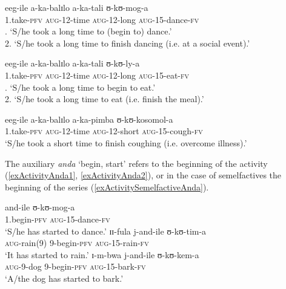\begin{exe}
\ex\label{exActivityTakeXTime}
\begin{xlist}
\ex \gll eeg-ile a-ka-balɪlo a-ka-tali ʊ-kʊ-mog-a\\
1.take-\textsc{pfv} \textsc{aug}-12-time \textsc{aug}-12-long \textsc{aug}-15-dance-\textsc{fv}\\
. \lq S/he took a long time to (begin to) dance.'\\
2. \lq S/he took a long time to finish dancing (i.e. at a social event).'

\ex \gll eeg-ile a-ka-balɪlo a-ka-tali ʊ-kʊ-ly-a\\
1.take-\textsc{pfv} \textsc{aug}-12-time \textsc{aug}-12-long \textsc{aug}-15-eat-\textsc{fv}\\
. \lq  S/he took a long time to begin to eat.'\\
2. \lq  S/he took a long time to eat (i.e. finish the meal).' 

\ex \gll eeg-ile a-ka-balɪlo a-ka-pimba ʊ-kʊ-kosomol-a\\
1.take-\textsc{pfv} \textsc{aug}-12-time \textsc{aug}-12-short \textsc{aug}-15-cough-\textsc{fv}\\
\glt \lq S/he took a short time to finish coughing (i.e. overcome illness).'
\end{xlist}
\end{exe}

The auxiliary \textit{anda} `begin, start' refers to the beginning of the activity (\ref{exActivityAnda1}, \ref{exActivityAnda2}), or in the case of semelfactives the beginning of the series (\ref{exActivitySemelfactiveAnda}).

\begin{exe}
\ex \begin{xlist}
\ex \label{exActivityAnda1}\gll and-ile ʊ-kʊ-mog-a\\
1.begin-\textsc{pfv} \textsc{aug}-15-dance-\textsc{fv}\\
\glt `S/he has started to dance.' 
\ex \label{exActivityAnda2} \gll ɪɪ-fula j-and-ile ʊ-kʊ-tim-a\\
\textsc{aug}-rain(9) 9-begin-\textsc{pfv} \textsc{aug}-15-rain-\textsc{fv}\\
\glt `It has started to rain.'
\ex \label{exActivitySemelfactiveAnda}\gll ɪ-m-bwa j-and-ile ʊ-kʊ-kem-a\\
\textsc{aug}-9-dog 9-begin-\textsc{pfv} \textsc{aug}-15-bark-\textsc{fv}\\
\glt `A/the dog has started to bark.'
\end{xlist}
\end{exe}

